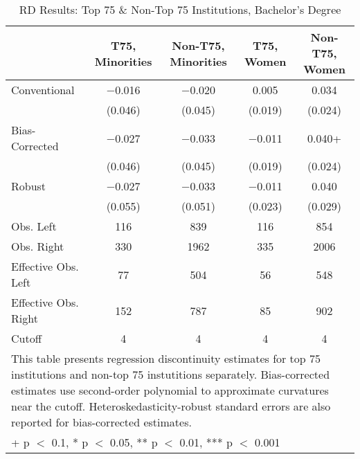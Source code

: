 \begin{table}

\caption{RD Results: Top 75 \& Non-Top 75 Institutions, Bachelor's Degree}
\centering
\begin{tabular}[t]{lcccc}
\toprule
  & T75, Minorities & Non-T75, Minorities & T75, Women & Non-T75, Women\\
\midrule
Conventional & \num{-0.016} & \num{-0.020} & \num{0.005} & \num{0.034}\\
 & (\num{0.046}) & (\num{0.045}) & (\num{0.019}) & \vphantom{1} (\num{0.024})\\
Bias-Corrected & \num{-0.027} & \num{-0.033} & \num{-0.011} & \num{0.040}+\\
 & (\num{0.046}) & (\num{0.045}) & (\num{0.019}) & (\num{0.024})\\
Robust & \num{-0.027} & \num{-0.033} & \num{-0.011} & \num{0.040}\\
 & (\num{0.055}) & (\num{0.051}) & (\num{0.023}) & (\num{0.029})\\
\midrule
Obs. Left & \num{116} & \num{839} & \num{116} & \num{854}\\
Obs. Right & \num{330} & \num{1962} & \num{335} & \num{2006}\\
Effective Obs. Left & \num{77} & \num{504} & \num{56} & \num{548}\\
Effective Obs. Right & \num{152} & \num{787} & \num{85} & \num{902}\\
Cutoff & \num{4} & \num{4} & \num{4} & \num{4}\\
\bottomrule
\multicolumn{5}{l}{\rule{0pt}{1em}This table presents regression discontinuity estimates
                for top 75 institutions and non-top 75 instutitions separately.
                Bias-corrected estimates use second-order polynomial
                to approximate curvatures near the cutoff. Heteroskedasticity-robust
                standard errors are also reported for bias-corrected estimates.}\\
\multicolumn{5}{l}{\rule{0pt}{1em}+ p $<$ 0.1, * p $<$ 0.05, ** p $<$ 0.01, *** p $<$ 0.001}\\
\end{tabular}
\end{table}
